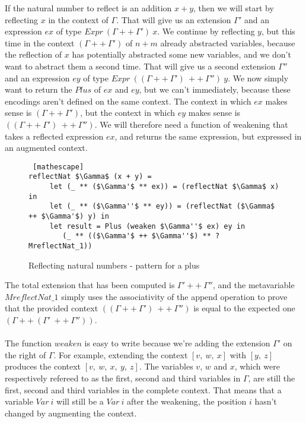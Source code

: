 If the natural number to reflect is an addition $x+y$, then we will start by reflecting $x$ in the context of $\Gamma$. That will give us an extension $\Gamma'$ and an expression $ex$ of type $Expr\ (\Gamma ++\ \Gamma')\ x$. We continue by reflecting $y$, but this time in the context $(\Gamma ++\ \Gamma')$ of $n+m$ already abstracted variables, because the reflection of $x$ has potentially abstracted some new variables, and we don't want to abstract them a second time. That will give us a second extension $\Gamma''$ and an expression $ey$ of type $Expr\ ((\Gamma ++\ \Gamma')\ ++\ \Gamma'')\ y$. We now simply want to return the $Plus$ of $ex$ and $ey$, but we can't immediately, because these encodings aren't defined on the same context. The context in which $ex$ makes sense is $(\Gamma ++\ \Gamma')$, but the context in which $ey$ makes sense is $((\Gamma ++\ \Gamma')\ ++\ \Gamma'')$. We will therefore need a function of weakening that takes a reflected expression $ex$, and returns the same expression, but expressed in an augmented context.

 \begin{figure}[H]
\figrule
\begin{center}
\begin{lstlisting} [mathescape]
reflectNat $\Gamma$ (x + y) =
     let (_ ** ($\Gamma'$ ** ex)) = (reflectNat $\Gamma$ x) in
     let (_ ** ($\Gamma''$ ** ey)) = (reflectNat ($\Gamma$ ++ $\Gamma'$) y) in
     let result = Plus (weaken $\Gamma''$ ex) ey in 
        (_ ** (($\Gamma'$ ++ $\Gamma''$) ** ?MreflectNat_1))
\end{lstlisting}
\end{center}
\caption{Reflecting natural numbers - pattern for a plus}
\label{reflectNat_pattern2}
\figrule
\end{figure}

The total extension that has been computed is $\Gamma' ++\ \Gamma''$, and the metavariable $MreflectNat\_1$ simply uses the associativity of the append operation to prove that the provided context $((\Gamma ++\ \Gamma')\ ++\ \Gamma'')$ is equal to the expected one $(\Gamma ++\ (\Gamma'\ ++\ \Gamma''))$. \\
\\
The function $weaken$ is easy to write because we're adding the extension $\Gamma'$ on the right of $\Gamma$. For example, extending the context $[v,\ w,\ x]$ with $[y,\ z]$ produces the context $[v,\ w,\ x,\ y,\ z]$. The variables $v$, $w$ and $x$, which were respectively refereed to as the first, second and third variables in $\Gamma$, are still the first, second and third variables in the complete context. That means that a variable $Var\ i$ will still be a $Var\ i$ after the weakening, the position $i$ hasn't changed by augmenting the context.

